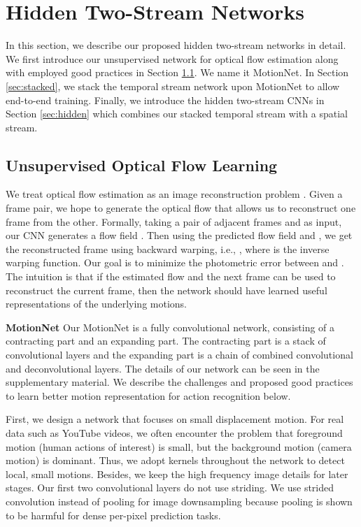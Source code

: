 \documentclass[runningheads]{llncs}
\begin{document}
		\section{Hidden Two-Stream Networks}
		\label{sec:method}
		In this section, we describe our proposed hidden two-stream networks in detail. 
		We first introduce our unsupervised network for optical flow estimation along with employed good practices in Section \ref{sec:unsup}. We name it MotionNet. 
		In Section \ref{sec:stacked}, we stack the temporal stream network upon MotionNet to allow end-to-end training. 
Finally, we introduce the hidden two-stream CNNs in Section \ref{sec:hidden} which combines our stacked temporal stream with a spatial stream.
		

		\subsection{Unsupervised Optical Flow Learning}
		\label{sec:unsup}
		We treat optical flow estimation as an image reconstruction problem \cite{jasonUnsup2016}. Given a frame pair, we hope to generate the optical flow that allows us to reconstruct one frame from the other. Formally, taking a pair of adjacent frames  and  as input, our CNN generates a flow field . Then using the predicted flow field  and , we get the reconstructed frame  using backward warping, i.e., , where  is the inverse warping function. Our goal is to minimize the photometric error between  and . The intuition is that if the estimated flow and the next frame can be used to reconstruct the current frame, then the network should have learned useful representations of the underlying motions.
		
		\noindent \textbf{MotionNet} 
		Our MotionNet is a fully convolutional network, consisting of a contracting part and an expanding part. The contracting part is a stack of convolutional layers and the expanding part is a chain of combined convolutional and deconvolutional layers. 
		The details of our network can be seen in the supplementary material. We describe the challenges and proposed good practices to learn better motion representation for action recognition below. 
		
		First, we design a network that focuses on small displacement motion. For real data such as YouTube videos, we often encounter the problem that foreground motion (human actions of interest) is small, but the background motion (camera motion) is dominant. Thus, we adopt  kernels throughout the network to detect local, small motions. Besides, we keep the high frequency image details for later stages. Our first two convolutional layers do not use striding. We use strided convolution instead of pooling for image downsampling because pooling is shown to be harmful for dense per-pixel prediction tasks. 
		
\end{document}
